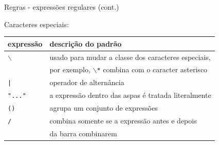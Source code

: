 \begin{frame}{Regras - expressões regulares (cont.)}

 Caracteres especiais:\bigskip

 \footnotesize
 \center
 \begin{tabular}{ll}
   \toprule
   \bf expressão &\bf    descrição do padrão\\
   \midrule
   {\tt $\backslash$}   & usado para mudar a classe dos caracteres especiais,\\
               & por exemplo, {\tt $\backslash$*} combina com o caracter asterisco\\
    {\tt |}         &   operador de alternância\\
    {\tt "..."}     &   a expressão dentro das aspas é tratada literalmente\\
    {\tt ()}       &    agrupa um conjunto de expressões\\
    {\tt /}        &    combina somente se a expressão antes e depois\\
                 &da barra combinarem\\
   \bottomrule
 \end{tabular}
 \end{frame}

